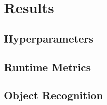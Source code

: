 \chapter{Results}\label{chapter:results}
\section{Hyperparameters}
\section{Runtime Metrics}
\section{Object Recognition}